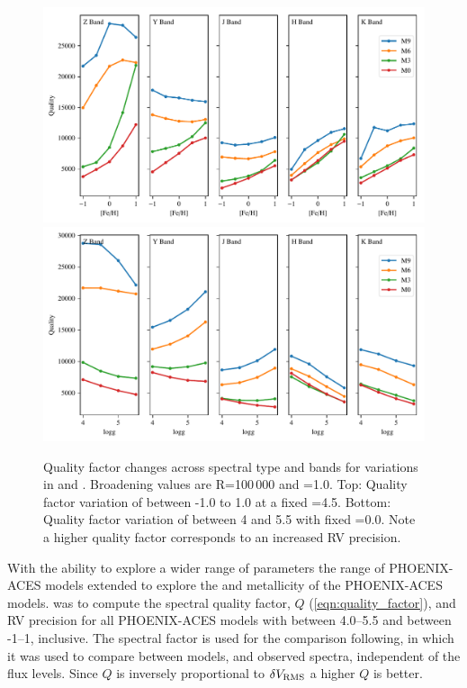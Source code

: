 \begin{figure}
    \includegraphics[width=0.99\linewidth]{figures/information-content/metalicity_effect.pdf}\\
    \includegraphics[width=0.99\linewidth]{figures/information-content/logg_effect.pdf}
    \caption[Quality factor verse \feh{} and \Logg{} for different spectral types and wavelength bands.]{Quality factor changes across spectral type and bands for variations in \feh{} and \Logg{}.
        Broadening values are R=100\,000 and \Vsini{}=1.0\kmps{}.
        Top: Quality factor variation of \feh{} between -1.0 to 1.0 at a fixed \Logg{}=4.5.
        Bottom: Quality factor variation of \Logg{} between 4 and 5.5 with fixed \feh{}=0.0.
        Note a higher quality factor corresponds to an increased {RV} precision.}
    \label{fig:deviations}
\end{figure}

With the ability to explore a wider range of parameters the range of {PHOENIX-ACES} models extended to explore the \Logg{} and metallicity of the {PHOENIX-ACES} models.
\Eniric{} was to compute the spectral quality factor, \(Q\) (\cref{eqn:quality_factor}), and {RV} precision for all {PHOENIX-ACES} models with \Logg{} between 4.0--5.5 and \feh{} between -1--1, inclusive.
The spectral factor is used for the comparison following, \citet{artigau_optical_2018} in which it was used to compare between models, and observed spectra, independent of the flux levels.
Since \(Q\) is inversely proportional to \(\delta V_{\textrm{RMS}}\) a higher \(Q\) is better.

